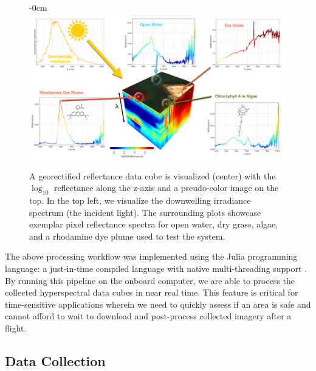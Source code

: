 \documentclass[remotesensing,article,accept,pdftex,moreauthors]{Definitions/mdpi}
\begin{document}
\begin{figure}[H]
\begin{adjustwidth}{-\extralength}{0cm}
\centering
\vspace{-0.1in}
\includegraphics[width=15.5cm]{figures/materials-and-methods/HyperSpectralInfoGraphic.pdf}
\end{adjustwidth}
\caption{A georectified reflectance data cube is visualized (center) with the $\log_{10}$ reflectance along the z-axis and a pseudo-color image on the top. In the top left, we visualize the downwelling irradiance spectrum (the incident light). The surrounding plots showcase exemplar pixel reflectance spectra for open water, dry grass, algae, and a rhodamine dye plume used to test the system.\label{fig:hsi-infographic}}
\end{figure}  

The above processing workflow was implemented using the Julia programming language: a just-in-time compiled language with native multi-threading support \cite{julia-1}. By running this pipeline on the onboard computer, we are able to process the collected hyperspectral data cubes in near real time. This feature is critical for time-sensitive applications wherein we need to quickly assess if an area is safe and cannot afford to wait to download and post-process collected imagery after a flight.

\subsection{Data Collection}
\end{document}
